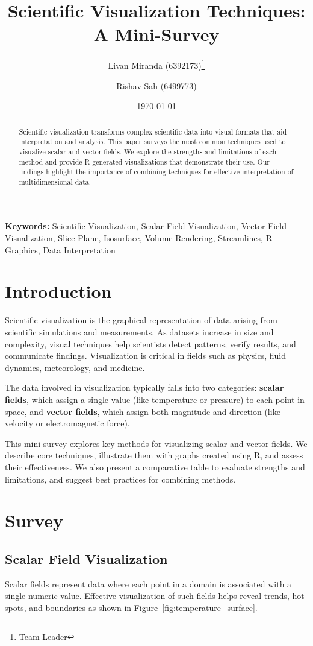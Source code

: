 \documentclass[11pt]{article}
\title{Scientific Visualization Techniques: A Mini-Survey}
\author{
	Livan Miranda (6392173)\thanks{Team Leader} \and
	Rishav Sah (6499773)
}
\date{\today}
\begin{document}
	
	\maketitle
	
	\begin{abstract}
		Scientific visualization transforms complex scientific data into visual formats that aid interpretation and analysis. This paper surveys the most common techniques used to visualize scalar and vector fields. We explore the strengths and limitations of each method and provide R-generated visualizations that demonstrate their use. Our findings highlight the importance of combining techniques for effective interpretation of multidimensional data.
	\end{abstract}
	
	\textbf{Keywords:} Scientific Visualization, Scalar Field Visualization, Vector Field Visualization, Slice Plane, Isosurface, Volume Rendering, Streamlines, R Graphics, Data Interpretation

	
	\section{Introduction}
	Scientific visualization is the graphical representation of data arising from scientific simulations and measurements. As datasets increase in size and complexity, visual techniques help scientists detect patterns, verify results, and communicate findings. Visualization is critical in fields such as physics, fluid dynamics, meteorology, and medicine.
	
	The data involved in visualization typically falls into two categories: \textbf{scalar fields}, which assign a single value (like temperature or pressure) to each point in space, and \textbf{vector fields}, which assign both magnitude and direction (like velocity or electromagnetic force).
	
	This mini-survey explores key methods for visualizing scalar and vector fields. We describe core techniques, illustrate them with graphs created using R, and assess their effectiveness. We also present a comparative table to evaluate strengths and limitations, and suggest best practices for combining methods.
	
	\section{Survey}
	
	\subsection{Scalar Field Visualization}
	Scalar fields represent data where each point in a domain is associated with a single numeric value. Effective visualization of such fields helps reveal trends, hot-spots, and boundaries as shown in Figure~\ref{fig:temperature_surface}.
	
\end{document}
